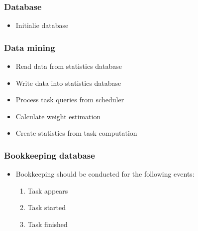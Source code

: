 {	\subsubsection{Database}
	
		\begin{itemize}
			\item Initialie database
		\end{itemize}
		
		\subsubsection{Data mining}
	
			\begin{itemize}
				\item Read data from statistics database
				\item Write data into statistics database
				\item Process task queries from scheduler
				\item Calculate weight estimation 
				\item Create statistics from task computation
			\end{itemize}
	
	
		
		
		\subsubsection{Bookkeeping database}
	
			\begin{itemize}
				\item Bookkeeping should be conducted for the following events:
				\begin{enumerate}
					\item Task appears
					\item Task started
					\item Task finished 
				\end{enumerate}
			\end{itemize}
	
}
